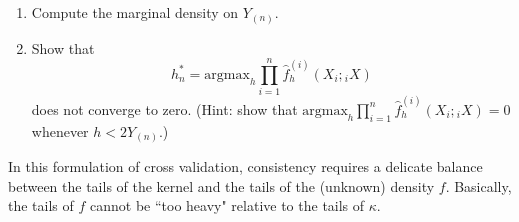 \documentclass[11pt]{report}
\begin{document}
\begin{enumerate}[1.]
\begin{enumerate}
              \item Compute the marginal density on $Y_{(n)}$.

              \item Show that
                    $$
                        h^*_n = \text{argmax}_h \prod_{i=1}^n \hat{f}^{(i)}_h(X_i;{_i}X)
                    $$
                    does not converge to zero. (Hint: show that $\displaystyle  \text{argmax}_h \prod_{i=1}^n \hat{f}^{(i)}_h(X_i;{_i}X) = 0$ whenever $h<2Y_{(n)}$.)

          \end{enumerate}

          In this formulation of cross validation, consistency requires a delicate balance between the tails of the kernel and the tails of the (unknown) density $f$. Basically, the tails of $f$ cannot be ``too heavy" relative to the tails of $\kappa$.






\end{enumerate}
\end{document}

